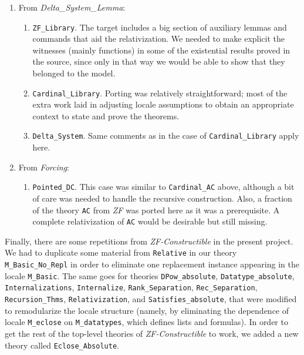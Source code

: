 \documentclass[11pt,a4paper,english]{article}
\newcommand{\session}[1]{\textit{#1}}
\newcommand{\theory}[1]{\texttt{#1}}
\begin{document}
\begin{enumerate}
\begin{enumerate}
  \end{enumerate}
\item From \session{Delta\_System\_Lemma}:
  \begin{enumerate}
  \item \theory{ZF\_Library}. The target includes a big section of
    auxiliary lemmas and commands that aid the relativization. We
    needed to make explicit the witnesses (mainly functions) in some of the
    existential results proved in the source, since only in that way
    we would be able to show that they belonged to the model.
  \item \theory{Cardinal\_Library}. Porting was relatively
    straightforward; most of the extra work laid in adjusting locale
    assumptions to obtain an appropriate context to state and prove
    the theorems.
  \item \theory{Delta\_System}. Same comments as in the case of
    \theory{Cardinal\_Library} apply here.
  \end{enumerate}
\item From \session{Forcing}:
  \begin{enumerate}
  \item \theory{Pointed\_DC}. This case was similar to
    \theory{Cardinal\_AC} above, although a bit of care was needed to
    handle the recursive construction. Also, a fraction of the theory
    \theory{AC} from \session{ZF} was ported here as it was a
    prerequisite. A complete relativization of \theory{AC} would be
    desirable but still missing.
  \end{enumerate}
\end{enumerate}

Finally, there are some repetitions from \session{ZF-Constructible} in
the present project. We had to duplicate some material from
\theory{Relative} in our theory \theory{M\_Basic\_No\_Repl}
in order to eliminate one replacement instance appearing in the locale
\texttt{M\_Basic}. The same goes for theories
\theory{DPow\_absolute}, 
\theory{Datatype\_absolute}, 
\theory{Internalizations}, 
\theory{Internalize}, 
\theory{Rank\_Separation}, 
\theory{Rec\_Separation}, 
\theory{Recursion\_Thms}, 
\theory{Relativization}, and
\theory{Satisfies\_absolute}, that were modified to remodularize the
locale structure (namely, by eliminating the dependence of locale
\texttt{M\_eclose} on \texttt{M\_datatypes}, which defines lists and
formulas). In order to get the rest of the top-level theories of
\session{ZF-Constructible} to work, we added a new theory called
\theory{Eclose\_Absolute}.






\end{document}
